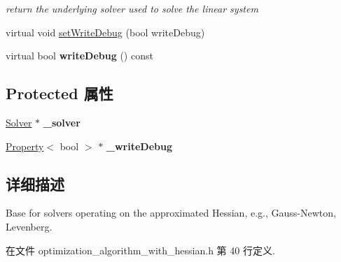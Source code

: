 \begin{DoxyCompactItemize}
\begin{DoxyCompactList}\small\item\em return the underlying solver used to solve the linear system \end{DoxyCompactList}\item 
virtual void \hyperlink{classg2o_1_1OptimizationAlgorithmWithHessian_a655aee24aae72b55f5edafb0a7a15137}{set\-Write\-Debug} (bool write\-Debug)
\item 
\hypertarget{classg2o_1_1OptimizationAlgorithmWithHessian_ac3f458237efd3b000de0032f97bca0b7}{virtual bool {\bfseries write\-Debug} () const }\label{classg2o_1_1OptimizationAlgorithmWithHessian_ac3f458237efd3b000de0032f97bca0b7}

\end{DoxyCompactItemize}
\subsection*{Protected 属性}
\begin{DoxyCompactItemize}
\item 
\hypertarget{classg2o_1_1OptimizationAlgorithmWithHessian_a88a2d1dccee8f7481ece407f2681a151}{\hyperlink{classg2o_1_1Solver}{Solver} $\ast$ {\bfseries \-\_\-solver}}\label{classg2o_1_1OptimizationAlgorithmWithHessian_a88a2d1dccee8f7481ece407f2681a151}

\item 
\hypertarget{classg2o_1_1OptimizationAlgorithmWithHessian_a6dd1e4e8dc2d09233c40de02b2c9fe8c}{\hyperlink{classg2o_1_1Property}{Property}$<$ bool $>$ $\ast$ {\bfseries \-\_\-write\-Debug}}\label{classg2o_1_1OptimizationAlgorithmWithHessian_a6dd1e4e8dc2d09233c40de02b2c9fe8c}

\end{DoxyCompactItemize}


\subsection{详细描述}
Base for solvers operating on the approximated Hessian, e.\-g., Gauss-\/\-Newton, Levenberg. 

在文件 optimization\-\_\-algorithm\-\_\-with\-\_\-hessian.\-h 第 40 行定义.



